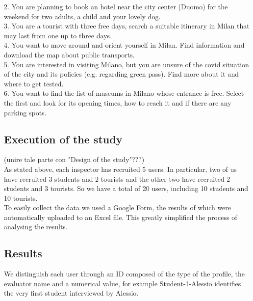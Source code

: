     2. You are planning to book an hotel near the city center (Duomo) for the weekend for two adults, a child and your lovely dog.\\
    3. You are a tourist with three free days, search a suitable itinerary in Milan that may last from one up to three days.\\
    4. You want to move around and orient yourself in Milan. Find information and download the map about public transports.\\
    5. You are interested in visiting Milano, but you are unsure of the covid situation of the city and its policies (e.g. regarding green pass). Find more about it and where to get tested.\\
    6. You want to find the list of museums in Milano whose entrance is free. Select the first and look for its opening times, how to reach it and if there are any parking spots.\\
    
\subsection{Execution of the study}
    (unire tale parte con "Design of the study"???)\\
    As stated above, each inspector has recruited 5 users. In particular, two of us have recruited 3 students and 2 tourists and the other two have recruited 2 students and 3 tourists. So we have a total of 20 users, including 10 students and 10 tourists.\\
    To easily collect the data we used a Google Form, the results of which were automatically uploaded to an Excel file. This greatly simplified the process of analysing the results.

\subsection{Results}

    We distinguish each user through an ID composed of the type of the profile, the evaluator name and a numerical value, for example Student-1-Alessio identifies the very first student interviewed by Alessio.
